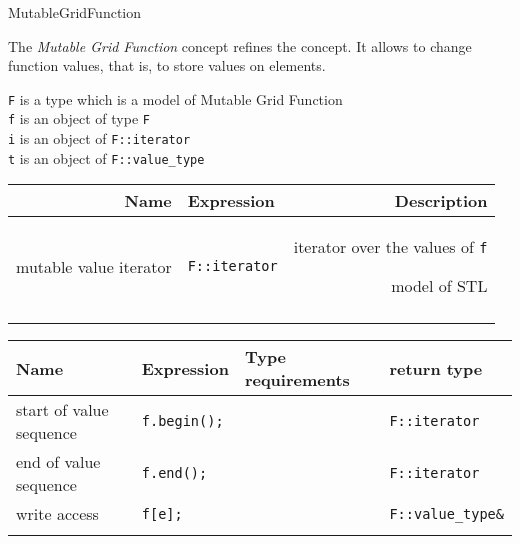 \begin{Label}{MutableGridFunction}
\end{Label}


The  {\em Mutable Grid Function\/} concept refines the 
 concept.
It allows to change function values, that is,
to store values on elements.



 
{\tt F} is a type which is a model of  Mutable  Grid  Function 
\\
{\tt f} is an object of type  {\tt F}
\\
{\tt i} is an object of  {\tt F::iterator}
\\
{\tt t} is an object of  {\tt F::value\_type}
\\

\begin{tabularx}{14cm}{RlR} 
  \hline
  \bf  Name  &\bf  Expression  &\bf  Description   \\ 
  \hline
  mutable value iterator &
  {\tt F::iterator} &
  iterator over the values of {\tt f}
  \par model of STL 
  \\ 
  \hline
  \\
\end{tabularx}

\begin{tabular}{llll} 
  \hline
  \bf  Name  &\bf  Expression  &\bf  Type requirements  & \bf  return type 
  \\ 
  \hline
  start of value sequence  &
  {\tt f.begin();} &
  ~ &
  {\tt F::iterator} 
  \\
  end of value sequence  &
  {\tt f.end();} &
  ~ &
  {\tt F::iterator} 
  \\
  write access &
  {\tt f[e];} &
  ~ &
  {\tt F::value\_type\&} 
  \\
  \hline
  \\
\end{tabular}

